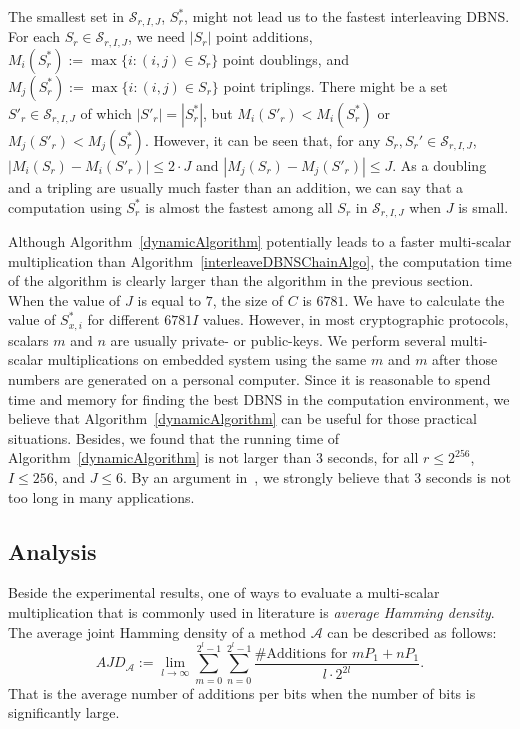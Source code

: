 The smallest set in $\mathcal{S}_{r, I, J}$, $S^*_r$, might not lead us to the fastest interleaving DBNS. For each $S_r \in \mathcal{S}_{r, I, J}$, we need $|S_r|$ point additions, $M_i(S^*_r) := \max \{i : (i,j) \in S_r\}$ point doublings, and $M_j(S^*_r) := \max \{i : (i,j) \in S_r\}$ point triplings.
There might be a set $S'_r \in \mathcal{S}_{r, I, J}$ of which $|S'_r| = |S^*_r|$, but $M_i(S'_r) < M_i(S^*_r)$ or $M_j(S'_r) < M_j(S^*_r)$. However, it can be seen that, for any $S_r, S_r' \in \mathcal{S}_{r, I, J}$, $|M_i(S_r) - M_i(S'_r)| \leq 2 \cdot J$ and $|M_j(S_r) - M_j(S'_r)| \leq J$. As a doubling and a tripling are usually much faster than an addition, we can say that a computation using $S^*_r$ is almost the fastest among all $S_r$ in $\mathcal{S}_{r,I,J}$ when $J$ is small.

Although Algorithm~\ref{dynamicAlgorithm} potentially leads to a faster multi-scalar multiplication than Algorithm~\ref{interleaveDBNSChainAlgo}, the computation time of the algorithm is clearly larger than the algorithm in the previous section. 
When the value of $J$ is equal to $7$, the size of $C$ is $6781$. We have to calculate the value of $S^*_{x,i}$ for different $6781I$ values. However, in most cryptographic protocols, scalars $m$ and $n$ are usually private- or public-keys.
We perform several multi-scalar multiplications on embedded system using the same $m$ and $m$ after those numbers are generated on a personal computer. 
Since it is reasonable to spend time and memory for finding the best DBNS in the computation environment, we believe that Algorithm~\ref{dynamicAlgorithm} can be useful for those practical situations. Besides, we found that the running time of Algorithm~\ref{dynamicAlgorithm} is not larger than $3$ seconds, for all $r \leq 2^{256}$, $I \leq 256$, and $J \leq 6$. By an argument in~\cite{experiment}, we strongly believe that $3$ seconds is not too long in many applications.

\subsection{Analysis}
\label{analysis}

Beside the experimental results, one of ways to evaluate a multi-scalar multiplication that is commonly used in literature is \textit{average Hamming density}. The average joint Hamming density of a method $\mathcal{A}$ can be described as follows:
$$AJD_\mathcal{A} := \lim\limits_{l \rightarrow \infty} \sum_{m = 0}^{2^l - 1} \sum_{n = 0}^{2^l - 1} \frac{\text{\#Additions for } mP_1 + nP_1}{l \cdot 2^{2l}}.$$
That is the average number of additions per bits when the number of bits is significantly large. 

